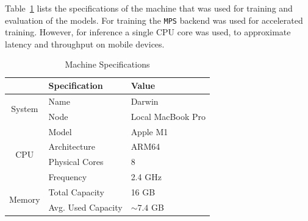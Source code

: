 \documentclass[a4paper]{article}
\begin{document}
  Table~\ref{tab:machine-specs} lists the specifications of the machine that was
  used for training and evaluation of the models. For training the \texttt{MPS}
  backend was used for accelerated training. However, for inference a single CPU
  core was used, to approximate latency and throughput on mobile devices.


  \begin{table}[ht]
    \centering
    \begin{tabular}{cll}
     \toprule
     & Specification & Value \\
     \midrule

     \multirow{2}{*}{System} & Name & Darwin \\
     \vspace{0.1cm}
     & Node & Local MacBook Pro \\

     \multirow{4}{*}{CPU} & Model & Apple M1 \\
     & Architecture & ARM64 \\
     & Physical Cores & 8 \\
     \vspace{0.1cm}
     & Frequency & 2.4 GHz \\

     \multirow{2}{*}{Memory} & Total Capacity & 16 GB \\
     & Avg. Used Capacity & $\sim 7.4$ GB \\

     \bottomrule
    \end{tabular}
    \caption{Machine Specifications}
    \label{tab:machine-specs}
  \end{table}
  


  \newpage
  \restoregeometry
\end{document}
